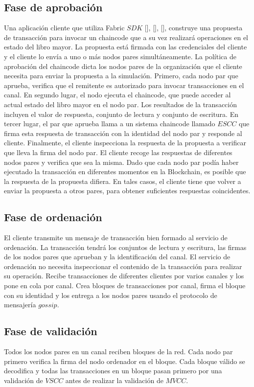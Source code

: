 \subsection{Fase de aprobaci\'on}
Una aplicaci\'on cliente que utiliza Fabric $SDK$ [\cite{Go-SDK}], [\cite{Node-SDK}], [\cite{Java-SDK}], construye una propuesta de transacci\'on para invocar un chaincode que a su vez realizar\'a operaciones en el estado del libro mayor. La propuesta est\'a firmada con las credenciales del cliente y el cliente lo env\'ia a uno o m\'as nodos pares simult\'aneamente. La pol\'itica de aprobaci\'on del chaincode dicta los nodos pares de la organizaci\'on que el cliente necesita para enviar la propuesta a la simulaci\'on. 
Primero, cada nodo par que aprueba, verifica que el remitente es autorizado para invocar transacciones en el canal. En segundo lugar, el nodo ejecuta el chaincode, que puede acceder al actual estado del libro mayor en el nodo par. Los resultados de la transacci\'on incluyen el valor de respuesta, conjunto de lectura y conjunto de escritura. En tercer lugar, el par que aprueba llama a un sistema chaincode llamado $ESCC$ que firma esta respuesta de transacci\'on con la identidad del nodo par y responde al cliente. Finalmente, el cliente inspecciona la respuesta de la propuesta a verificar que lleva la firma del nodo par. El cliente recoge las respuestas de diferentes nodos pares y verifica que sea la misma. Dado que cada nodo par pod\'ia haber ejecutado la transacci\'on en diferentes momentos en la Blockchain, es posible que la respuesta de la propuesta difiera. En tales casos, el cliente tiene que volver a enviar la propuesta a otros pares, para obtener suficientes respuestas coincidentes.

\subsection{Fase de ordenaci\'on}
El cliente transmite un mensaje de transacci\'on bien formado al servicio de ordenaci\'on. La transacci\'on tendr\'a los conjuntos de lectura y escritura, las firmas de los nodos pares que aprueban y la identificaci\'on del canal. El servicio de ordenaci\'on no necesita inspeccionar el contenido de la transacci\'on para realizar su operaci\'on. Recibe transacciones de diferentes clientes por varios canales y los pone en cola por canal. Crea bloques de transacciones por canal, firma el bloque con su identidad y los entrega a los nodos pares usando el protocolo de mensajer\'ia $gossip$.

\subsection{Fase de validaci\'on}
Todos los nodos pares en un canal reciben bloques de la red. Cada nodo par primero verifica la firma del nodo ordenador en el bloque. Cada bloque v\'alido se decodifica y todas las transacciones en un bloque pasan primero por una validaci\'on de $VSCC$ antes de realizar la validaci\'on de $MVCC$.

